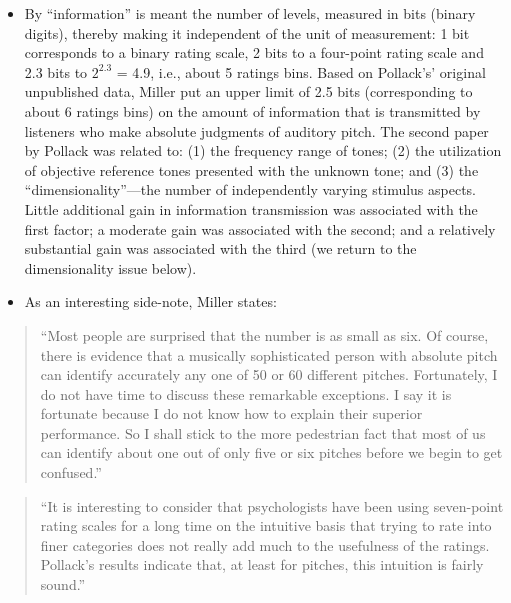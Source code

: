 \documentclass[
]{book}
\begin{document}
\begin{itemize}
\item
  By ``information'' is meant the number of levels, measured in bits (binary digits), thereby making it independent of the unit of measurement: 1 bit corresponds to a binary rating scale, 2 bits to a four-point rating scale and 2.3 bits to \(2^{2.3}\) = 4.9, i.e., about 5 ratings bins. Based on Pollack's' original unpublished data, Miller put an upper limit of 2.5 bits (corresponding to about 6 ratings bins) on the amount of information that is transmitted by listeners who make absolute judgments of auditory pitch. The second paper \citep[@][]{pollack1953information} by Pollack was related to: (1) the frequency range of tones; (2) the utilization of objective reference tones presented with the unknown tone; and (3) the ``dimensionality''---the number of independently varying stimulus aspects. Little additional gain in information transmission was associated with the first factor; a moderate gain was associated with the second; and a relatively substantial gain was associated with the third (we return to the dimensionality issue below).
\item
  As an interesting side-note, Miller states:
\end{itemize}

\begin{quote}
``Most people are surprised that the number is as small as six. Of course, there is evidence that a musically sophisticated person with absolute pitch can identify accurately any one of 50 or 60 different pitches. Fortunately, I do not have time to discuss these remarkable exceptions. I say it is fortunate because I do not know how to explain their superior performance. So I shall stick to the more pedestrian fact that most of us can identify about one out of only five or six pitches before we begin to get confused.''
\end{quote}

\begin{quote}
``It is interesting to consider that psychologists have been using seven-point rating scales for a long time on the intuitive basis that trying to rate into finer categories does not really add much to the usefulness of the ratings. Pollack's results indicate that, at least for pitches, this intuition is fairly sound.''
\end{quote}
\end{document}

